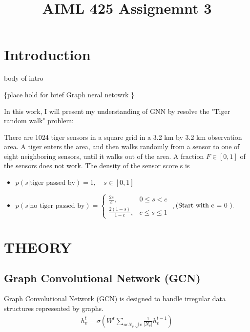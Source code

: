 \documentclass{article}
\title{AIML 425 Assignemnt 3}
\begin{document}
%
\maketitle
%
\section{Introduction}
\label{sec:intro}

body of intro

\{place hold for brief Graph neral netowrk \}

In this work, I will present my understanding of GNN by resolve the "Tiger random walk" problem:

There are 1024 tiger sensors in a square grid in a 3.2 km
by 3.2 km observation area. A tiger enters the area, and then
walks randomly from a sensor to one of eight neighboring
sensors, until it walks out of the area. A fraction $F \in [0, 1]$ of
the sensors does not work. The density of the sensor score s is

\begin{itemize}
  \item $p(s | \text{tiger passed by}) = 1, \quad s \in [0, 1]$
  \item $p(s | \text{no tiger passed by}) = \begin{cases} \frac{2s}{c}, & 0 \leq s < c \\\frac{2(1 - s)}{1 - c}, & c \leq s \leq 1 \end{cases}$
  $\\,\text{(Start with  c = 0 ).}$
\end{itemize}



\section{THEORY}
\label{sec:theory}

\subsection{Graph Convolutional Network (GCN)}
\label{ssec:gcn}

Graph Convolutional Network (GCN) \cite{kipf2016semi} is designed to handle irregular data structures represented by graphs. 
\begin{align}
  h_{v}^{t}=\sigma \left ( 
    W^t
    \sum_{u\epsilon N_v\bigcup v}
    \frac{1}{\left | N_v \right |} 
    h_{v}^{t-1}
    \right )
\end{align}
\end{document}
